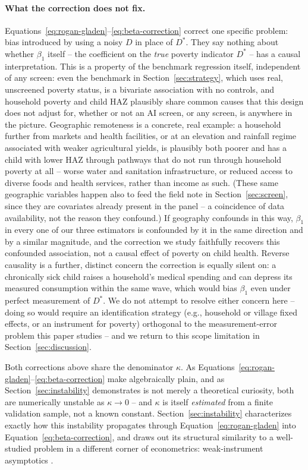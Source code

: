 \documentclass[12pt]{article}
\begin{document}
\paragraph{What the correction does not fix.} Equations~\ref{eq:rogan-gladen}--\ref{eq:beta-correction} correct one specific problem: bias introduced by using a noisy $D$ in place of $D^{*}$. They say nothing about whether $\beta_1$ itself -- the coefficient on the \emph{true} poverty indicator $D^{*}$ -- has a causal interpretation. This is a property of the benchmark regression itself, independent of any screen: even the benchmark in Section~\ref{sec:strategy}, which uses real, unscreened poverty status, is a bivariate association with no controls, and household poverty and child HAZ plausibly share common causes that this design does not adjust for, whether or not an AI screen, or any screen, is anywhere in the picture. Geographic remoteness is a concrete, real example: a household further from markets and health facilities, or at an elevation and rainfall regime associated with weaker agricultural yields, is plausibly both poorer and has a child with lower HAZ through pathways that do not run through household poverty at all -- worse water and sanitation infrastructure, or reduced access to diverse foods and health services, rather than income as such. (These same geographic variables happen also to feed the field note in Section~\ref{sec:screen}, since they are covariates already present in the panel -- a coincidence of data availability, not the reason they confound.) If geography confounds in this way, $\beta_1$ in every one of our three estimators is confounded by it in the same direction and by a similar magnitude, and the correction we study faithfully recovers this confounded association, not a causal effect of poverty on child health. Reverse causality is a further, distinct concern the correction is equally silent on: a chronically sick child raises a household's medical spending and can depress its measured consumption within the same wave, which would bias $\beta_1$ even under perfect measurement of $D^{*}$. We do not attempt to resolve either concern here -- doing so would require an identification strategy (e.g., household or village fixed effects, or an instrument for poverty) orthogonal to the measurement-error problem this paper studies -- and we return to this scope limitation in Section~\ref{sec:discussion}.

Both corrections above share the denominator $\kappa$. As Equations~\ref{eq:rogan-gladen}--\ref{eq:beta-correction} make algebraically plain, and as Section~\ref{sec:instability} demonstrates is not merely a theoretical curiosity, both are numerically unstable as $\kappa \to 0$ -- and $\kappa$ is itself \emph{estimated} from a finite validation sample, not a known constant. Section~\ref{sec:instability} characterizes exactly how this instability propagates through Equation~\ref{eq:rogan-gladen} into Equation~\ref{eq:beta-correction}, and draws out its structural similarity to a well-studied problem in a different corner of econometrics: weak-instrument asymptotics \citep{staiger1997instrumental}.
\end{document}
